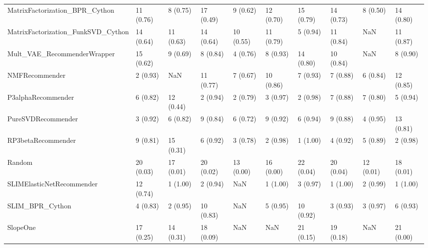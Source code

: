 \begin{tabular}{llllllllll}
     MatrixFactorization\_BPR\_Cython &                11 (0.76) &    8 (0.75) &     17 (0.49) &     9 (0.62) &            12 (0.70) &           15 (0.79) &         14 (0.73) &           8 (0.50) &         14 (0.80) \\
 MatrixFactorization\_FunkSVD\_Cython &                14 (0.64) &   11 (0.63) &     14 (0.64) &    10 (0.55) &            11 (0.79) &            5 (0.94) &         11 (0.84) &                NaN &         11 (0.87) \\
        Mult\_VAE\_RecommenderWrapper &                15 (0.62) &    9 (0.69) &      8 (0.84) &     4 (0.76) &             8 (0.93) &           14 (0.80) &         10 (0.84) &                NaN &          8 (0.90) \\
                     NMFRecommender &                 2 (0.93) &         NaN &     11 (0.77) &     7 (0.67) &            10 (0.86) &            7 (0.93) &          7 (0.88) &           6 (0.84) &         12 (0.85) \\
                 P3alphaRecommender &                 6 (0.82) &   12 (0.44) &      2 (0.94) &     2 (0.79) &             3 (0.97) &            2 (0.98) &          7 (0.88) &           7 (0.80) &          5 (0.94) \\
                 PureSVDRecommender &                 3 (0.92) &    6 (0.82) &      9 (0.84) &     6 (0.72) &             9 (0.92) &            6 (0.94) &          9 (0.88) &           4 (0.95) &         13 (0.81) \\
                 RP3betaRecommender &                 9 (0.81) &   15 (0.31) &      6 (0.92) &     3 (0.78) &             2 (0.98) &            1 (1.00) &          4 (0.92) &           5 (0.89) &          2 (0.98) \\
                             Random &                20 (0.03) &   17 (0.01) &     20 (0.02) &    13 (0.00) &            16 (0.00) &           22 (0.04) &         20 (0.04) &          12 (0.01) &         18 (0.01) \\
          SLIMElasticNetRecommender &                12 (0.74) &    1 (1.00) &      2 (0.94) &          NaN &             1 (1.00) &            3 (0.97) &          1 (1.00) &           2 (0.99) &          1 (1.00) \\
                    SLIM\_BPR\_Cython &                 4 (0.83) &    2 (0.95) &     10 (0.83) &          NaN &             5 (0.95) &           10 (0.92) &          3 (0.93) &           3 (0.97) &          6 (0.93) \\
                           SlopeOne &                17 (0.25) &   14 (0.31) &     18 (0.09) &          NaN &                  NaN &           21 (0.15) &         19 (0.18) &                NaN &         21 (0.00) \\

\end{tabular}
